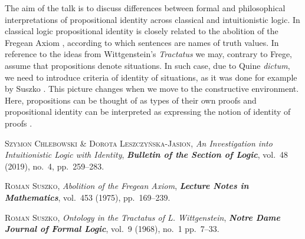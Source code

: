 \documentclass[bsl,meeting]{asl}
\newcommand{\NP}{}
\begin{document}
\thispagestyle{empty}


\NP  
{}


The aim of the talk is to discuss differences between formal and philosophical interpretations of propositional identity across classical and intuitionistic logic. In classical logic propositional identity is closely related to the abolition of the Fregean Axiom \cite{suszko1975}, according to which sentences are names of truth values. In reference to the ideas from Wittgenstein's  \emph{Tractatus} we may, contrary to Frege, assume that propositions denote situations. In such case, due to Quine \emph{dictum}, we need to introduce criteria of identity of situations, as it was done for example by Suszko \cite{suszko1968}. This picture changes when we move to the constructive environment. Here, propositions can be thought of as types of their own proofs and propositional identity can be interpreted as expressing the notion of identity of proofs \cite{isci}.



\begin{thebibliography}{10}

{\scshape Szymon Chlebowski \& Dorota Leszczy{\'n}ska-Jasion},
{\itshape An Investigation into Intuitionistic Logic with Identity},
{\bfseries\itshape Bulletin of the Section of Logic},
vol.~48 (2019), no.~4, pp.~259--283.

{\scshape Roman Suszko},
{\itshape Abolition of the Fregean Axiom},
{\bfseries\itshape Lecture Notes in Mathematics},
vol.~453 (1975), pp.~169--239.

{\scshape Roman Suszko},
{\itshape Ontology in the Tractatus of L. Wittgenstein},
{\bfseries\itshape Notre Dame Journal of Formal Logic},
vol.~9 (1968), no.~1 pp.~7--33.


\end{thebibliography}


\vspace*{-0.5\baselineskip}
\end{document}
